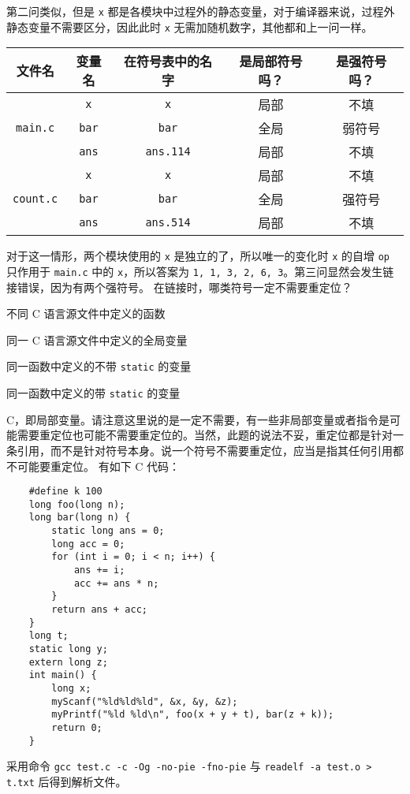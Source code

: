 \begin{problems}
        第二问类似，但是 \verb|x| 都是各模块中过程外的静态变量，对于编译器来说，过程外静态变量不需要区分，因此此时 \verb|x| 无需加随机数字，其他都和上一问一样。
        \begin{table}[H]
            \centering
            \begin{tabular}{|c|c|c|c|c|}
                \hline
                文件名 & 变量名 & 在符号表中的名字 & 是局部符号吗？ & 是强符号吗？ \\ \hline
                \multirow{3}{*}{\texttt{main.c}} & \texttt{x} & \verb|x| & 局部 & 不填 \\ \cline{2-5} 
                & \texttt{bar} & \verb|bar| & 全局 & 弱符号 \\ \cline{2-5} 
                & \texttt{ans} & \verb|ans.114| & 局部 & 不填 \\ \hline
                \multirow{3}{*}{\texttt{count.c}} & \texttt{x} & \verb|x| & 局部 & 不填 \\ \cline{2-5} 
                & \texttt{bar} & \verb|bar| & 全局 & 强符号 \\ \cline{2-5} 
                & \texttt{ans} & \verb|ans.514| & 局部 & 不填 \\ \hline
            \end{tabular}
        \end{table}
        对于这一情形，两个模块使用的 \verb|x| 是独立的了，所以唯一的变化时 \verb|x| 的自增 \verb|op| 只作用于 \verb|main.c| 中的 \verb|x|，所以答案为 \verb|1, 1, 3, 2, 6, 3|。第三问显然会发生链接错误，因为有两个强符号。
        \pro 在链接时，哪类符号一定不需要重定位？
        \begin{choices}
            \item 不同 C 语言源文件中定义的函数
            \item 同一 C 语言源文件中定义的全局变量
            \item 同一函数中定义的不带 \verb|static| 的变量
            \item 同一函数中定义的带 \verb|static| 的变量
        \end{choices}
        \sol C，即局部变量。请注意这里说的是一定不需要，有一些非局部变量或者指令是可能需要重定位也可能不需要重定位的。当然，此题的说法不妥，重定位都是针对一条引用，而不是针对符号本身。说一个符号不需要重定位，应当是指其任何引用都不可能要重定位。
        \pro 有如下 C 代码：
        \begin{verbatim}
    #define k 100
    long foo(long n);
    long bar(long n) {
        static long ans = 0;
        long acc = 0;
        for (int i = 0; i < n; i++) {
            ans += i;
            acc += ans * n;
        }
        return ans + acc;
    } 
    long t;
    static long y;
    extern long z;
    int main() {
        long x;
        myScanf("%ld%ld%ld", &x, &y, &z);
        myPrintf("%ld %ld\n", foo(x + y + t), bar(z + k));
        return 0;
    }
        \end{verbatim}
        采用命令 \verb|gcc test.c -c -Og -no-pie -fno-pie| 与 \verb|readelf -a test.o > t.txt| 后得到解析文件。


\end{problems}
